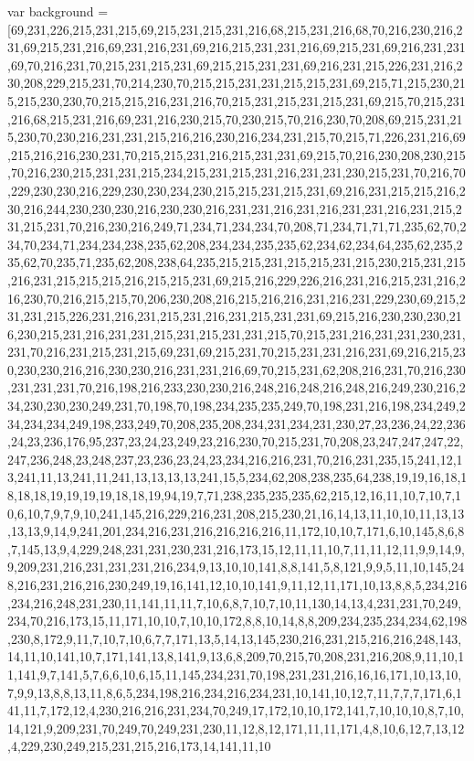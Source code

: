 var background = [69,231,226,215,231,215,69,215,231,215,231,216,68,215,231,216,68,70,216,230,216,231,69,215,231,216,69,231,216,231,69,216,215,231,231,216,69,215,231,69,216,231,231,69,70,216,231,70,215,231,215,231,69,215,215,231,231,69,216,231,215,226,231,216,230,208,229,215,231,70,214,230,70,215,215,231,231,215,215,231,69,215,71,215,230,215,215,230,230,70,215,215,216,231,216,70,215,231,215,231,215,231,69,215,70,215,231,216,68,215,231,216,69,231,216,230,215,70,230,215,70,216,230,70,208,69,215,231,215,230,70,230,216,231,231,215,216,216,230,216,234,231,215,70,215,71,226,231,216,69,215,216,216,230,231,70,215,215,231,216,215,231,231,69,215,70,216,230,208,230,215,70,216,230,215,231,231,215,234,215,231,215,231,216,231,231,230,215,231,70,216,70,229,230,230,216,229,230,230,234,230,215,215,231,215,231,69,216,231,215,215,216,230,216,244,230,230,230,216,230,230,216,231,231,216,231,216,231,231,216,231,215,231,215,231,70,216,230,216,249,71,234,71,234,234,70,208,71,234,71,71,71,235,62,70,234,70,234,71,234,234,238,235,62,208,234,234,235,235,62,234,62,234,64,235,62,235,235,62,70,235,71,235,62,208,238,64,235,215,215,231,215,215,231,215,230,215,231,215,216,231,215,215,215,216,215,215,231,69,215,216,229,226,216,231,216,215,231,216,216,230,70,216,215,215,70,206,230,208,216,215,216,216,231,216,231,229,230,69,215,231,231,215,226,231,216,231,215,231,216,231,215,231,231,69,215,216,230,230,230,216,230,215,231,216,231,231,215,231,215,231,231,215,70,215,231,216,231,231,230,231,231,70,216,231,215,231,215,69,231,69,215,231,70,215,231,231,216,231,69,216,215,230,230,230,216,216,230,230,216,231,231,216,69,70,215,231,62,208,216,231,70,216,230,231,231,231,70,216,198,216,233,230,230,216,248,216,248,216,248,216,249,230,216,234,230,230,230,249,231,70,198,70,198,234,235,235,249,70,198,231,216,198,234,249,234,234,234,249,198,233,249,70,208,235,208,234,231,234,231,230,27,23,236,24,22,236,24,23,236,176,95,237,23,24,23,249,23,216,230,70,215,231,70,208,23,247,247,247,22,247,236,248,23,248,237,23,236,23,24,23,234,216,216,231,70,216,231,235,15,241,12,13,241,11,13,241,11,241,13,13,13,13,241,15,5,234,62,208,238,235,64,238,19,19,16,18,18,18,18,19,19,19,19,18,18,19,94,19,7,71,238,235,235,235,62,215,12,16,11,10,7,10,7,10,6,10,7,9,7,9,10,241,145,216,229,216,231,208,215,230,21,16,14,13,11,10,10,11,13,13,13,13,9,14,9,241,201,234,216,231,216,216,216,216,11,172,10,10,7,171,6,10,145,8,6,8,7,145,13,9,4,229,248,231,231,230,231,216,173,15,12,11,11,10,7,11,11,12,11,9,9,14,9,9,209,231,216,231,231,231,216,234,9,13,10,10,141,8,8,141,5,8,121,9,9,5,11,10,145,248,216,231,216,216,230,249,19,16,141,12,10,10,141,9,11,12,11,171,10,13,8,8,5,234,216,234,216,248,231,230,11,141,11,11,7,10,6,8,7,10,7,10,11,130,14,13,4,231,231,70,249,234,70,216,173,15,11,171,10,10,7,10,10,172,8,8,10,14,8,8,209,234,235,234,234,62,198,230,8,172,9,11,7,10,7,10,6,7,7,171,13,5,14,13,145,230,216,231,215,216,216,248,143,14,11,10,141,10,7,171,141,13,8,141,9,13,6,8,209,70,215,70,208,231,216,208,9,11,10,11,141,9,7,141,5,7,6,6,10,6,15,11,145,234,231,70,198,231,231,216,16,16,171,10,13,10,7,9,9,13,8,8,13,11,8,6,5,234,198,216,234,216,234,231,10,141,10,12,7,11,7,7,7,171,6,141,11,7,172,12,4,230,216,216,231,234,70,249,17,172,10,10,172,141,7,10,10,10,8,7,10,14,121,9,209,231,70,249,70,249,231,230,11,12,8,12,171,11,11,171,4,8,10,6,12,7,13,12,4,229,230,249,215,231,215,216,173,14,141,11,10